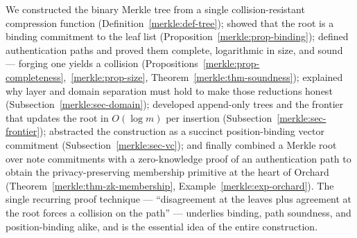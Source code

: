 \documentclass[11pt,a4paper]{article}
\theoremstyle{definition}
\theoremstyle{remark}
\begin{document}
We constructed the binary Merkle tree from a single collision-resistant compression function (Definition~\ref{merkle:def-tree}); showed that the root is a binding commitment to the leaf list (Proposition~\ref{merkle:prop-binding}); defined authentication paths and proved them complete, logarithmic in size, and sound --- forging one yields a collision (Propositions~\ref{merkle:prop-completeness},~\ref{merkle:prop-size}, Theorem~\ref{merkle:thm-soundness}); explained why layer and domain separation must hold to make those reductions honest (Subsection~\ref{merkle:sec-domain}); developed append-only trees and the frontier that updates the root in \(O(\log m)\) per insertion (Subsection~\ref{merkle:sec-frontier}); abstracted the construction as a succinct position-binding vector commitment (Subsection~\ref{merkle:sec-vc}); and finally combined a Merkle root over note commitments with a zero-knowledge proof of an authentication path to obtain the privacy-preserving membership primitive at the heart of Orchard (Theorem~\ref{merkle:thm-zk-membership}, Example~\ref{merkle:exp-orchard}). The single recurring proof technique --- ``disagreement at the leaves plus agreement at the root forces a collision on the path'' --- underlies binding, path soundness, and position-binding alike, and is the essential idea of the entire construction.
\end{document}
